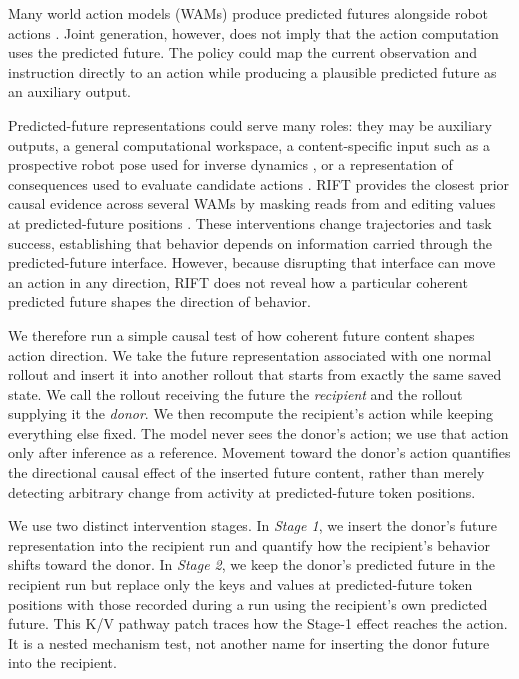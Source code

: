\documentclass{article}
\begin{document}
Many world action models (WAMs) produce predicted futures alongside robot actions \citep{kim2026cosmospolicy,nvidia2026cosmos3}. Joint generation, however, does not imply that the action computation uses the predicted future. The policy could map the current observation and instruction directly to an action while producing a plausible predicted future as an auxiliary output.

Predicted-future representations could serve many roles: they may be auxiliary outputs, a general computational workspace, a content-specific input such as a prospective robot pose used for inverse dynamics \citep{hu2025vpp,du2023unipi}, or a representation of consequences used to evaluate candidate actions \citep{ebert2018visualforesight,du2024videolanguage}. RIFT provides the closest prior causal evidence across several WAMs by masking reads from and editing values at predicted-future positions \citep{zhang2026rift}. These interventions change trajectories and task success, establishing that behavior depends on information carried through the predicted-future interface. However, because disrupting that interface can move an action in any direction, RIFT does not reveal how a particular coherent predicted future shapes the direction of behavior.

We therefore run a simple causal test of how coherent future content shapes action direction. We take the future representation associated with one normal rollout and insert it into another rollout that starts from exactly the same saved state. We call the rollout receiving the future the \emph{recipient} and the rollout supplying it the \emph{donor}. We then recompute the recipient's action while keeping everything else fixed. The model never sees the donor's action; we use that action only after inference as a reference. Movement toward the donor's action quantifies the directional causal effect of the inserted future content, rather than merely detecting arbitrary change from activity at predicted-future token positions.

We use two distinct intervention stages. In \emph{Stage 1}, we insert the donor's future representation into the recipient run and quantify how the recipient's behavior shifts toward the donor. In \emph{Stage 2}, we keep the donor's predicted future in the recipient run but replace only the keys and values at predicted-future token positions with those recorded during a run using the recipient's own predicted future. This K/V pathway patch traces how the Stage-1 effect reaches the action. It is a nested mechanism test, not another name for inserting the donor future into the recipient.
\end{document}
